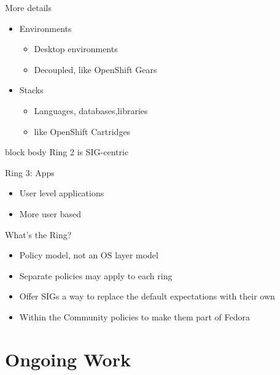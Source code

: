 \documentclass{beamer}
\begin{document}
\begin{frame}{More details}
  \begin{itemize}
    \item Environments
    \begin{itemize}
      \item Desktop environments
      \item Decoupled, like OpenShift Gears
    \end{itemize}
    \item Stacks
    \begin{itemize}
      \item Languages, databases,libraries
      \item like OpenShift Cartridges
    \end{itemize}
  \end{itemize}
  \begin{beamercolorbox}[center,ht=2ex,dp=0.5ex,rounded=true]{block body}
    {\centering Ring 2 is SIG-centric}
  \end{beamercolorbox}
\end{frame}

\begin{frame}{Ring 3: Apps}
  \begin{itemize}
    \item User level applications
    \item More user based
  \end{itemize}
\end{frame}

\begin{frame}{What's the Ring?}
  \begin{itemize}
    \item Policy model, not an OS layer model
    \item Separate policies may apply to each ring
    \item Offer SIGs a way to replace the default expectations with their own
    \item Within the Community policies to make them part of Fedora
  \end{itemize}
\end{frame}

\section{Ongoing Work}
\end{document}

